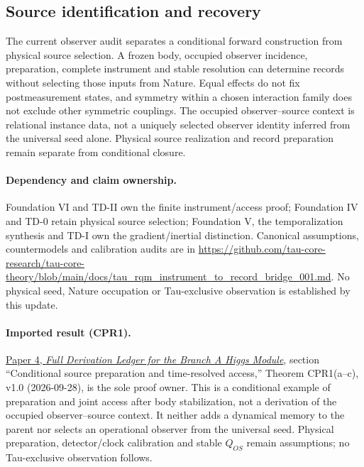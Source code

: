 \documentclass[11pt]{article}
\begin{document}
\subsection{Source identification and recovery}
The current observer audit separates a conditional forward construction from physical source selection. A frozen body, occupied observer incidence, preparation, complete instrument and stable resolution can determine records without selecting those inputs from Nature. Equal effects do not fix postmeasurement states, and symmetry within a chosen interaction family does not exclude other symmetric couplings. The occupied observer--source context is relational instance data, not a uniquely selected observer identity inferred from the universal seed alone. Physical source realization and record preparation remain separate from conditional closure.

\paragraph{Dependency and claim ownership.}
Foundation VI and TD-II own the finite instrument/access proof; Foundation IV and TD-0 retain physical source selection; Foundation V, the temporalization synthesis and TD-I own the gradient/inertial distinction. Canonical assumptions, countermodels and calibration audits are in \url{https://github.com/tau-core-research/tau-core-theory/blob/main/docs/tau_rqm_instrument_to_record_bridge_001.md}. No physical seed, Nature occupation or Tau-exclusive observation is established by this update.

\paragraph{Imported result (CPR1).}
\href{https://github.com/tau-core-research/tau-core-higgs-module-paper4/blob/main/paper4_full_derivation/full_derivation.pdf#nameddest=cpr1}{Paper 4, \emph{Full Derivation Ledger for the Branch A Higgs Module}}, section ``Conditional source preparation and time-resolved access,'' Theorem CPR1(a--c), v1.0 (2026-09-28), is the sole proof owner.
This is a conditional example of preparation and joint access after body stabilization, not a derivation of the occupied observer--source context. It neither adds a dynamical memory to the parent nor selects an operational observer from the universal seed.
Physical preparation, detector/clock calibration and stable $Q_{OS}$ remain assumptions; no Tau-exclusive observation follows.
\end{document}
